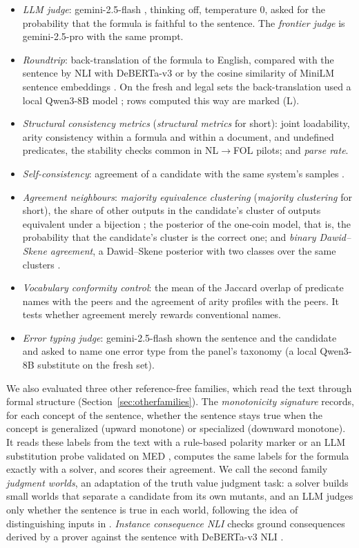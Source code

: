 \documentclass[11pt,letterpaper]{article}
\begin{document}
\begin{itemize}
  \item \emph{LLM judge}: gemini-2.5-flash \citep{Comanici2025}, thinking off, temperature 0, asked for the probability that the formula is faithful to the sentence. The \emph{frontier judge} is gemini-2.5-pro with the same prompt.
  \item \emph{Roundtrip}: back-translation of the formula to English, compared with the sentence by NLI with DeBERTa-v3 \citep{He2021} or by the cosine similarity of MiniLM \citep{Wang2020} sentence embeddings \citep{Reimers2019}. On the fresh and legal sets the back-translation used a local Qwen3-8B model \citep{Yang2025}; rows computed this way are marked (L).
  \item \emph{Structural consistency metrics} (\emph{structural metrics} for short): joint loadability, arity consistency within a formula and within a document, and undefined predicates, the stability checks common in NL$\rightarrow$FOL pilots; and \emph{parse rate}.
  \item \emph{Self-consistency}: agreement of a candidate with the same system's samples \citep{Wang2022}.
  \item \emph{Agreement neighbours}: \emph{majority equivalence clustering} (\emph{majority clustering} for short), the share of other outputs in the candidate's cluster of outputs equivalent under a bijection \citep{Li2024}; the posterior of the one-coin model, that is, the probability that the candidate's cluster is the correct one; and \emph{binary Dawid--Skene agreement}, a Dawid--Skene posterior with two classes over the same clusters \citep{Dawid1979}.
  \item \emph{Vocabulary conformity control}: the mean of the Jaccard overlap of predicate names with the peers and the agreement of arity profiles with the peers. It tests whether agreement merely rewards conventional names.
  \item \emph{Error typing judge}: gemini-2.5-flash shown the sentence and the candidate and asked to name one error type from the panel's taxonomy (a local Qwen3-8B substitute on the fresh set).
\end{itemize}

We also evaluated three other reference-free families, which read the text through formal structure (Section~\ref{sec:otherfamilies}). The \emph{monotonicity signature} records, for each concept of the sentence, whether the sentence stays true when the concept is generalized (upward monotone) or specialized (downward monotone). It reads these labels from the text with a rule-based polarity marker \citep{Chen2021} or an LLM substitution probe validated on MED \citep{Yanaka2019}, computes the same labels for the formula exactly with a solver, and scores their agreement. We call the second family \emph{judgment worlds}, an adaptation of the truth value judgment task: a solver builds small worlds that separate a candidate from its own mutants, and an LLM judges only whether the sentence is true in each world, following the idea of distinguishing inputs in \citet{Fan2024}. \emph{Instance consequence NLI} checks ground consequences derived by a prover against the sentence with DeBERTa-v3 NLI \citep{He2021}.
\end{document}
